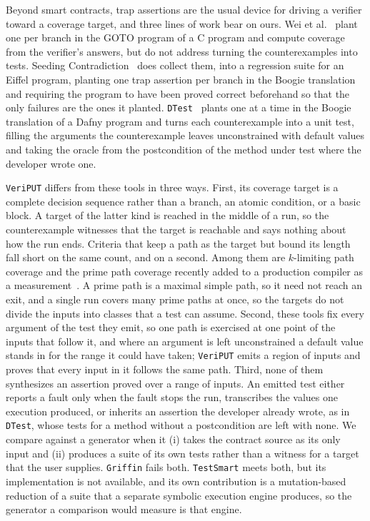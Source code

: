 \documentclass[manuscript,anonymous]{acmart}
\newcommand{\tool}[1]{\texttt{#1}}
\begin{document}
Beyond smart contracts, trap assertions are the usual device for driving a
verifier toward a coverage target, and three lines of work bear on ours. Wei et
al.~\cite{wei2025esbmc} plant one per branch in the GOTO program of a C program
and compute coverage from the verifier's answers, but do not address turning the
counterexamples into tests. Seeding Contradiction~\cite{SeedingContradiction2025}
does collect them, into a regression suite for an Eiffel program, planting one
trap assertion per branch in the Boogie translation and requiring the program to
have been proved correct beforehand so that the only failures are the ones it
planted. \tool{DTest}~\cite{DTest2023} plants one at a time in the Boogie
translation of a Dafny program and turns each counterexample into a unit test,
filling the arguments the counterexample leaves unconstrained with default
values and taking the oracle from the postcondition of the method under test
where the developer wrote one.

\tool{VeriPUT} differs from these tools in three ways. First, its coverage
target is a complete decision sequence rather than a branch, an atomic
condition, or a basic block. A target of the latter kind is reached in the
middle of a run, so the counterexample witnesses that the target is reachable
and says nothing about how the run ends. Criteria that keep a path as the
target but bound its length fall short on the same count, and on a second.
Among them are $k$-limiting path coverage and the prime path coverage recently
added to a production compiler as a
measurement~\cite{AmmannOffutt,primepath_gcc}. A prime path is a maximal simple
path, so it need not reach an exit, and a single run covers many prime paths at
once, so the targets do not divide the inputs into classes that a test can
assume. Second, these tools fix every argument of the test they emit, so one
path is exercised at one point of the inputs that follow it, and where an
argument is left unconstrained a default value stands in for the range it could
have taken; \tool{VeriPUT} emits a region of inputs and proves that every input
in it follows the same path. Third, none of them synthesizes an assertion
proved over a range of inputs. An emitted test either reports a fault only when
the fault stops the run, transcribes the values one execution produced, or
inherits an assertion the developer already wrote, as in \tool{DTest}, whose
tests for a method without a postcondition are left with none. We compare
against a generator when it (i) takes the contract source as its only input and
(ii) produces a suite of its own tests rather than a witness for a target that
the user supplies. \tool{Griffin} fails both. \tool{TestSmart} meets both, but
its implementation is not available, and its own contribution is a
mutation-based reduction of a suite that a separate symbolic execution engine
produces, so the generator a comparison would measure is that engine.
\end{document}
